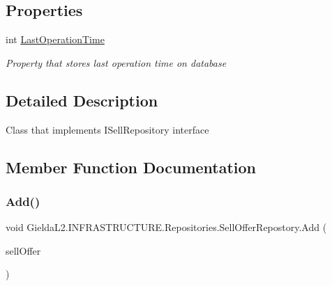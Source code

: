 \subsection*{Properties}
\begin{DoxyCompactItemize}
\item 
int \mbox{\hyperlink{class_gielda_l2_1_1_i_n_f_r_a_s_t_r_u_c_t_u_r_e_1_1_repositories_1_1_sell_offer_repostory_af456365d00cc4fcbb2f280ec86dc1a1c}{Last\+Operation\+Time}}
\begin{DoxyCompactList}\small\item\em Property that stores last operation time on database \end{DoxyCompactList}\end{DoxyCompactItemize}


\subsection{Detailed Description}
Class that implements I\+Sell\+Repository interface 



\subsection{Member Function Documentation}
\mbox{\label{class_gielda_l2_1_1_i_n_f_r_a_s_t_r_u_c_t_u_r_e_1_1_repositories_1_1_sell_offer_repostory_a9998a9883c5ae73fb854eeff44075e73}} 
\subsubsection{\texorpdfstring{Add()}{Add()}}
{\footnotesize\ttfamily void Gielda\+L2.\+I\+N\+F\+R\+A\+S\+T\+R\+U\+C\+T\+U\+R\+E.\+Repositories.\+Sell\+Offer\+Repostory.\+Add (\begin{DoxyParamCaption}\item[{\mbox{\hyperlink{class_gielda_l2_1_1_d_b_1_1_entities_1_1_sell_offer}{Sell\+Offer}}}]{sell\+Offer }\end{DoxyParamCaption})}



